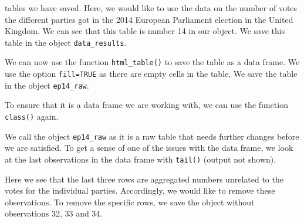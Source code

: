 \documentclass[12pt,oneside]{reedthesis}
\theoremstyle{definition}
\theoremstyle{definition}
\theoremstyle{definition}
\theoremstyle{remark}
\begin{document}
  tables we have saved. Here, we would like to use the data on the number
  of votes the different parties got in the 2014 European Parliament
  election in the United Kingdom. We can see that this table is number 14
  in our object. We save this table in the object \texttt{data\_results}.
  \begin{Shaded}
  \begin{Highlighting}[]
  \StringTok{ }\NormalTok{data_table[[}\NormalTok{]] }
  \end{Highlighting}
  \end{Shaded}
  We can now use the function \texttt{html\_table()} to save the table as
  a data frame. We use the option \texttt{fill=TRUE} as there are empty
  cells in the table. We save the table in the object \texttt{ep14\_raw}.
  \begin{Shaded}
  \begin{Highlighting}[]
  \StringTok{ }\NormalTok{)}
  \end{Highlighting}
  \end{Shaded}
  To ensure that it is a data frame we are working with, we can use the
  function \texttt{class()} again.
  \begin{Shaded}
  \begin{Highlighting}[]
  \end{Highlighting}
  \end{Shaded}
  We call the object \texttt{ep14\_raw} as it is a raw table that needs
  further changes before we are satisfied. To get a sense of one of the
  issues with the data frame, we look at the last observations in the data
  frame with \texttt{tail()} (output not shown).
  \begin{Shaded}
  \begin{Highlighting}[]
  \end{Highlighting}
  \end{Shaded}
  Here we see that the last three rows are aggregated numbers unrelated to
  the votes for the individual parties. Accordingly, we would like to
  remove these observations. To remove the specific rows, we save the
  object without observations 32, 33 and 34.
  \begin{Shaded}
  \begin{Highlighting}[]
  \StringTok{ }\NormalTok{ep14_raw[}\OperatorTok{-}\NormalTok{(}\OperatorTok{:}\NormalTok{), ]}
  \end{Highlighting}
  \end{Shaded}
\end{document}

